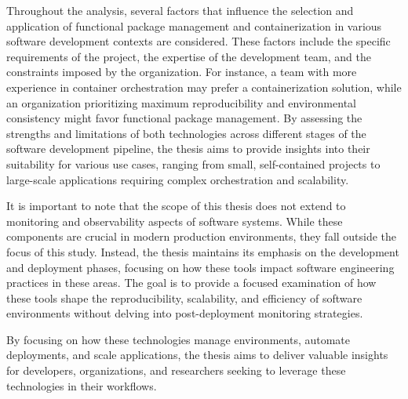 Throughout the analysis, several factors that influence the selection and application of
functional package management and containerization in various software development
contexts are considered. These factors include the specific requirements of the project,
the expertise of the development team, and the constraints imposed by the organization.
For instance, a team with more experience in container orchestration may prefer a
containerization solution, while an organization prioritizing maximum reproducibility and
environmental consistency might favor functional package management. By assessing the
strengths and limitations of both technologies across different stages of the software
development pipeline, the thesis aims to provide insights into their suitability for
various use cases, ranging from small, self-contained projects to large-scale applications
requiring complex orchestration and scalability.

It is important to note that the scope of this thesis does not extend to monitoring and
observability aspects of software systems. While these components are crucial in modern
production environments, they fall outside the focus of this study. Instead, the thesis
maintains its emphasis on the development and deployment phases, focusing on how
these tools impact software engineering practices
in these areas. The goal is to provide a focused examination of how these tools shape
the reproducibility, scalability, and efficiency of software environments without delving
into post-deployment monitoring strategies.

By focusing on how these technologies manage environments,
automate deployments, and scale applications,
the thesis aims to deliver valuable insights for developers, organizations, and researchers
seeking to leverage these technologies in their workflows.
